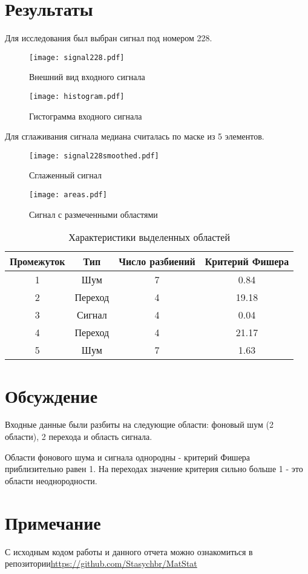 \documentclass[a4paper,12pt]{article} %
\begin{document}
\section{Результаты}
Для исследования был выбран сигнал под номером 228. 
\begin{figure}[H]
    \centering
    \texttt{[image: signal228.pdf]}
    \caption{Внешний вид входного сигнала}
    \label{fig:imag}
\end{figure}
\begin{figure}[H]
    \centering
    \texttt{[image: histogram.pdf]}
    \caption{Гистограмма входного сигнала}
    \label{fig:hist}
\end{figure}
Для сглаживания сигнала медиана считалась по маске из 5 элементов.
\begin{figure}[H]
    \centering
    \texttt{[image: signal228smoothed.pdf]}
    \caption{Сглаженный сигнал}
    \label{fig:smooth}
\end{figure}
\begin{figure}[H]
    \centering
    \texttt{[image: areas.pdf]}
    \caption{Сигнал с размеченными областями}
    \label{fig:areas}
\end{figure}
\begin{table}[H]
    \centering
    \begin{tabular}{|c|c|c|c|}
        \hline
         Промежуток&Тип&Число разбиений& Критерий Фишера \\
         \hline
         1&Шум&7&0.84\\
         \hline
         2&Переход&4&19.18\\
         \hline
         3&Сигнал&4&0.04\\
         \hline
         4&Переход&4&21.17\\
         \hline
         5&Шум&7&1.63\\
         \hline
    \end{tabular}
    \caption{Характеристики выделенных областей}
    \label{tab:tab1}
\end{table}
\section{Обсуждение}
Входные данные были разбиты на следующие области: фоновый шум (2 области), 2 перехода и область сигнала.

Области фонового шума и сигнала однородны - критерий Фишера приблизительно равен 1. На переходах значение критерия сильно больше 1 - это области неоднородности.
\section*{Примечание}
С исходным кодом работы и данного отчета можно ознакомиться в репозитории\;\url{https://github.com/Stasychbr/MatStat}
\end{document}
